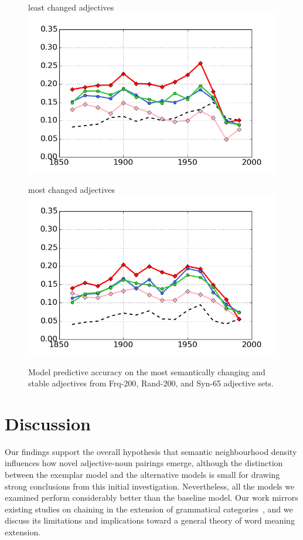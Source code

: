 \documentclass[output=paper]{langsci/langscibook}
\begin{document}
\begin{figure}[p]
\begin{minipage}{.5\textwidth}
   least changed adjectives
  \includegraphics[width=.95\linewidth]{figures/GREWAL_syn65_least_changed.png}
\end{minipage}\begin{minipage}{.5\textwidth}
   most changed adjectives
  \includegraphics[width=.95\linewidth]{figures/GREWAL_syn65_most_changed.png}
\end{minipage}
\caption{Model predictive accuracy on the most semantically changing and stable adjectives from {\sc Frq-200}, {\sc Rand-200}, and {\sc Syn-65} adjective sets.}
\label{fig:change-stable}
\end{figure}



\section{Discussion}

Our findings support the overall hypothesis that semantic neighbourhood density influences how novel adjective-noun pairings emerge, although the distinction between the exemplar model and the alternative models is small for drawing strong conclusions from this initial investigation. Nevertheless, all the models we examined perform considerably better than the baseline model. Our work mirrors existing studies on chaining in the extension of grammatical categories~\citep{lakoff1987,bybee1994evolution,habibi}, and we discuss its limitations and implications toward a general theory of word meaning extension.
\end{document}
